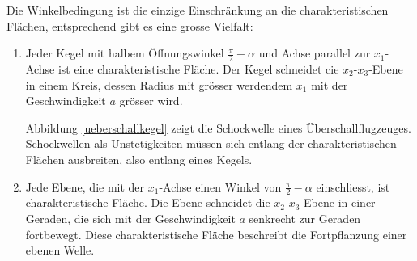 Die Winkelbedingung ist die einzige Einschränkung an
die charakteristischen Flächen,  entsprechend gibt es eine
grosse Vielfalt:
\begin{enumerate}
\item
Jeder Kegel mit halbem Öffnungswinkel $\frac{\pi}2-\alpha$
und Achse parallel zur $x_1$-Achse ist eine charakteristische Fläche.
Der Kegel schneidet cie $x_2$-$x_3$-Ebene in einem Kreis, dessen Radius mit
grösser werdendem $x_1$ mit der Geschwindigkeit $a$ grösser wird.

Abbildung \ref{ueberschallkegel}
zeigt die Schockwelle eines Überschallflugzeuges. Schockwellen
als Unstetigkeiten müssen sich entlang der charakteristischen Flächen ausbreiten,
also entlang eines Kegels.
\item 
Jede Ebene, die mit der $x_1$-Achse einen Winkel von $\frac\pi2-\alpha$
einschliesst, ist charakteristische Fläche.
Die Ebene schneidet die $x_2$-$x_3$-Ebene in einer Geraden, die sich
mit der Geschwindigkeit $a$ senkrecht zur Geraden fortbewegt.
Diese charakteristische Fläche beschreibt die Fortpflanzung einer
ebenen Welle.
\end{enumerate}


